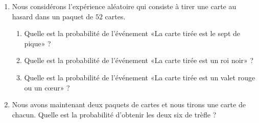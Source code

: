 
\begin{exercice}\label{exosmath-0280}

    \begin{enumerate}
        \item
            Nous considérons l'expérience aléatoire qui consiste à tirer une carte au hasard dans un paquet de \( 52\) cartes.
            \begin{enumerate}
                \item
                    Quelle est la probabilité de l'événement «La carte tirée est le sept de pique» ?
                \item
                    Quelle est la probabilité de l'événement «La carte tirée est un roi noir» ?
                \item
                    Quelle est la probabilité de l'événement «La carte tirée est un valet rouge ou un cœur» ?
            \end{enumerate}
        \item
            Nous avons maintenant deux paquets de cartes et nous tirons une carte de chacun. Quelle est la probabilité d'obtenir les deux six de trèfle ?
    \end{enumerate}

\end{exercice}
